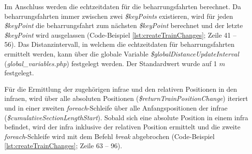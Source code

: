 Im Anschluss werden die \Gls{echtzeitdaten} für die \Gls{beharrungsfahrt}en berechnet. Da \Gls{beharrungsfahrt}en immer zwischen zwei \textit{\$key\-Points} existieren, wird für jeden \textit{\$key\-Point} die \Gls{beharrungsfahrt} zum nächsten \textit{\$keyPoint} berechnet und der letzte \textit{\$keyPoint} wird ausgelassen (Code-Beispiel \ref{lst:createTrainChanges}; Zeile 41 -- 56). Das Distanzintervall, in welchem die \Gls{echtzeitdaten} für \Gls{beharrungsfahrt}en ermittelt werden, kann über die globale Variable \textit{\$globalDistanceUpdateInterval} (\textit{global\_variables.php}) festgelegt werden. Der Standardwert wurde auf 1 $m$ festgelegt.

Für die Ermittlung der zugehörigen \ac{infra}e und den relativen Positionen in den \ac{infra}en, wird über alle absoluten Positionen (\textit{\$returnTrainPositionChange}) iteriert und in einer zweiten \textit{foreach}-Schleife über alle Anfangspositionen der \ac{infra}e (\textit{\$cumulativeSectionLengthStart}). Sobald sich eine absolute Position in einem \ac{infra} befindet, wird der \ac{infra} inklusive der relativen Position ermittelt und die zweite \textit{foreach}-Schleife wird mit dem Befehl \textit{break} abgebrochen (Code-Beispiel \ref{lst:createTrainChanges}; Zeile 63 -- 96).
\vspace{20pt}
